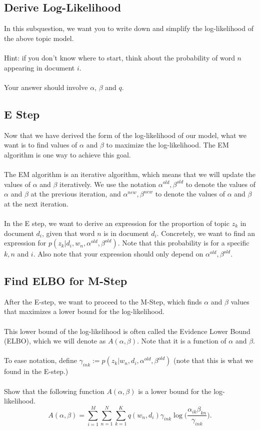 \documentclass{exam}
\begin{document}
\subsection{Derive Log-Likelihood} 
In this subquestion, we want you to write down and simplify the log-likelihood of the above topic model.
\\\\Hint: if you don't know where to start, think about the probability of word $n$ appearing in document $i$.  
\\\\Your answer should involve $\alpha$, $\beta$ and $q$. 
\subsection{E Step}  
Now that we have derived the form of the log-likelihood of our model, what we want is to find values of $\alpha$ and $\beta$ to maximize the log-likelihood. The EM algorithm is one way to achieve this goal. 
\\\\The EM algorithm is an iterative algorithm, which means that we will update the values of $\alpha$ and $\beta$ iteratively. We use the notation $\alpha^{old},\beta^{old}$ to denote the values of $\alpha$ and $\beta$ at the previous iteration, and $\alpha^{new},\beta^{new}$ to denote the values of $\alpha$ and $\beta$ at the next iteration. 
\\\\In the E step, we want to derive an expression for the proportion of topic $z_k$ in document $d_i$, given that word $n$ is in document $d_i$. Concretely, we want to find an expression for $p(z_k|d_i,w_n,\alpha^{old},\beta^{old})$. Note that this probability is for a specific $k, n$ and $i$. Also note that your expression should only depend on $\alpha^{old},\beta^{old}$.
\subsection{Find ELBO for M-Step}
After the E-step, we want to proceed to the M-Step, which finds $\alpha$ and $\beta$ values that maximizes a lower bound for the log-likelihood. 
\\\\
This lower bound of the log-likelihood is often called the Evidence Lower Bound (ELBO), which we will denote as $A(\alpha, \beta)$. Note that it is a function of $\alpha$ and $\beta$.
\\\\
To ease notation, define $\gamma_{ink} := p(z_k|w_n,d_i,\alpha^{old},\beta^{old})$ (note that this is what we found in the E-step.) 
\\\\
Show that the following function $A(\alpha,\beta)$ is a lower bound for the log-likelihood. 
	\[A(\alpha,\beta)= \sum_{i=1}^M\sum_{n=1}^N\sum_{k=1}^Kq(w_n,d_i)\gamma_{ink}\log\big(\frac{\alpha_{ik}\beta_{kn}}{\gamma_{ink}}\big).\]
\end{document}
